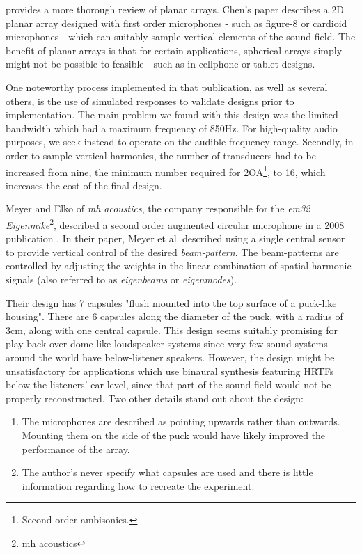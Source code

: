 
\cite{chen2015theory} provides a more thorough review of planar arrays. Chen's paper describes a 2D planar array designed with first order microphones - such as figure-8 or cardioid microphones - which can suitably sample vertical elements of the sound-field. The benefit of planar arrays is that for certain applications, spherical arrays simply might not be possible to feasible - such as in cellphone or tablet designs. 

One noteworthy process implemented in that publication, as well as several others, is the use of simulated responses to validate designs prior to implementation. The main problem we found with this design was the limited bandwidth which had a maximum frequency of 850Hz. For high-quality audio purposes, we seek instead to operate on the audible frequency range. Secondly, in order to sample vertical harmonics, the number of transducers had to be increased from nine, the minimum number required for 2OA\footnote{Second order ambisonics.}, to 16, which increases the cost of the final design. 

Meyer and Elko of \textit{mh acoustics}, the company responsible for the \textit{em32 Eigenmike}\footnote{\href{https://mhacoustics.com/}{mh acoustics}}, described a second order augmented circular microphone in a 2008 publication \cite{meyer2008spherical}. In their paper, Meyer et al. described using a single central sensor to provide vertical control of the desired \textit{beam-pattern}. The beam-patterns are controlled by adjusting the weights in the linear combination of spatial harmonic signals (also referred to as \textit{eigenbeams} or \textit{eigenmodes}). 

Their design has 7 capsules "flush mounted into the top surface of a puck-like housing". There are 6 capsules along the diameter of the puck, with a radius of 3cm, along with one central capsule. This design seems suitably promising for play-back over dome-like loudspeaker systems since very few sound systems around the world have below-listener speakers. However, the design might be unsatisfactory for applications which use binaural synthesis featuring HRTFs below the listeners' ear level, since that part of the sound-field would not be properly reconstructed. Two other details stand out about the design:

\begin{enumerate}
    \item The microphones are described as pointing upwards rather than outwards. Mounting them on the side of the puck would have likely improved the performance of the array. 
    \item The author's never specify what capsules are used and there is little information regarding how to recreate the experiment.
\end{enumerate}

